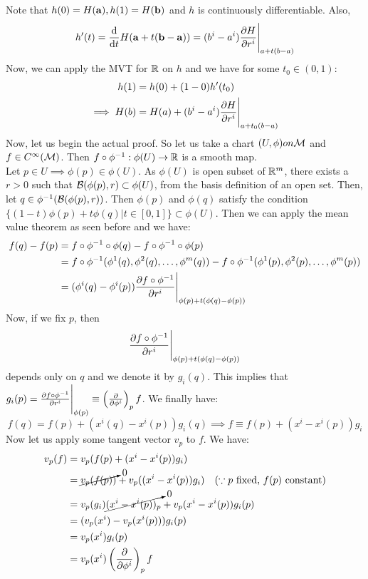 Note that $h(0) = H(\boldsymbol{\mathbf{a}}), h(1) = H(\boldsymbol{\mathbf{b}})$ and $h$ is continuously differentiable. Also,
$$h'(t) = \dv{t} H(\boldsymbol{\mathbf{a}}+t(\boldsymbol{\mathbf{b}}-\boldsymbol{\mathbf{a}})) = (b^i - a^i)\pdv{H}{r^i}\Bigg|_{a+t(b-a)}$$
Now, we can apply the MVT for $\mathbb{R}$ on $h$ and we have for some $t_0\in (0,1)$:
\begin{align*}
  h(1) &= h(0) + (1-0)h'(t_0)\\
\implies H(b) &= H(a) +  (b^i - a^i)\pdv{H}{r^i}\Bigg|_{a+t_0(b-a)}
\end{align*}
Now, let us begin the actual proof. So let us take a chart $(U,\phi) on \mathcal M$ and $f\in C^\infty(\mathcal M)$. Then $f\circ\phi^{-1}: \phi(U)\rightarrow \mathbb{R}$ is a smooth map.\\[0.2cm]
Let $p\in U\implies \phi(p)\in \phi(U)$. As $\phi(U)$ is open subset of $\mathbb{R}^m$, there exists a $r>0$ such that $\mathcal B(\phi(p), r)\subset \phi(U)$, from the basis definition of an open set. Then, let $q\in \phi^{-1}(\mathcal B(\phi(p), r))$. Then $\phi(p)$ and $\phi(q)$ satisfy the condition $\{(1-t)\phi(p) +t\phi(q)|t\in[0,1]\}\subset \phi(U)$. Then we can apply the mean value theorem as seen before and we have:
\begin{align*}
  f(q)-f(p) &= f\circ\phi^{-1} \circ \phi(q) - f\circ\phi^{-1} \circ \phi(p)\\
&=f\circ\phi^{-1}(\phi^1(q), \phi^2(q),\ldots,\phi^m(q)) - f\circ\phi^{-1}(\phi^1(p), \phi^2(p),\ldots,\phi^m(p))\\
&=(\phi^i(q)-\phi^i(p))\pdv{f\circ\phi^{-1}}{r^i}\Bigg|_{\phi(p) +t(\phi(q)-\phi(p))}
\end{align*}
Now, if we fix $p$, then $$\pdv{f\circ\phi^{-1}}{r^i}\Bigg|_{\phi(p) +t(\phi(q)-\phi(p))}$$ depends only on $q$ and we denote it by $g_i(q)$. This implies that $g_i(p) = \pdv{f\circ\phi^{-1}}{r^i}\Bigg|_{\phi(p)} \equiv \left( \pdv{\phi^i} \right)_p f$. We finally have:
$$f(q)=f(p)+(x^i(q)-x^i(p))g_i(q)\implies f\equiv f(p)+(x^i-x^i(p))g_i$$
Now let us apply some tangent vector $v_p$ to $f$. We have:
\begin{align*}
  v_p(f) &= v_p(f(p)+(x^i-x^i(p))g_i)\\
  &=\cancelto{0}{v_p(f(p))}+v_p((x^i-x^i(p))g_i) \quad (\because p \text{ fixed, $f(p)$ constant})\\
  &=v_p(g_i)\cancelto{0}{(x^i-x^i(p))_p} + v_p(x^i - x^i(p))g_i(p)\\
  &=(v_p(x^i) - v_p(x^i(p)))g_i(p)\\
  &=v_p(x^i)g_i(p) \\
  &= v_p(x^i)\left( \pdv{\phi^i} \right)_p f
\end{align*}
